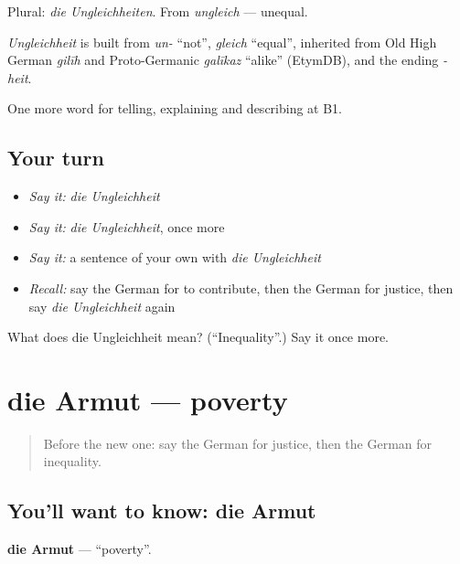 Plural: \emph{die Ungleichheiten}. From \emph{ungleich} — unequal.

\begin{cousinweb}
\emph{Ungleichheit} is built from \emph{un-} \textquotedblleft{}not\textquotedblright{}, \emph{gleich} \textquotedblleft{}equal\textquotedblright{}, inherited from Old High German \emph{gilīh} and Proto-Germanic \emph{galīkaz} \textquotedblleft{}alike\textquotedblright{} (EtymDB), and the ending \emph{-heit}.
\end{cousinweb}

\begin{grammarlens}[title={What you've built}]
One more word for telling, explaining and describing at B1.
\end{grammarlens}

\subsection*{Your turn}
\begin{itemize}
\raggedright
  \item \emph{Say it:} \emph{die Ungleichheit}
  \item \emph{Say it:} \emph{die Ungleichheit}, once more
  \item \emph{Say it:} a sentence of your own with \emph{die Ungleichheit}
  \item \emph{Recall:} say the German for to contribute, then the German for justice, then say \emph{die Ungleichheit} again
\end{itemize}

\begin{tcolorbox}[breakable,colback=teal!4,colframe=teal!35!black,title={Before you move on}]
What does die Ungleichheit mean? (\textquotedblleft{}Inequality\textquotedblright{}.) Say it once more.
\end{tcolorbox}
\section[die Armut]{die Armut — poverty}

\label{lesson:GE-C359-armut}



\begin{quote}
Before the new one: say the German for justice, then the German for inequality.
\end{quote}

\subsection*{You'll want to know: die Armut}
\textbf{die Armut} — \textquotedblleft{}poverty\textquotedblright{}.

